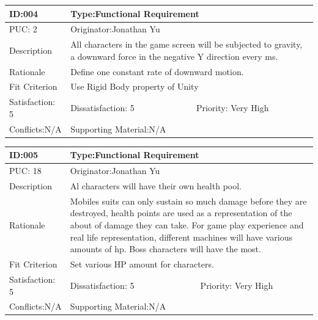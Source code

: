 \documentclass{article}
\begin{document}
\begin{table}[H]
\begin{tabular}{|l|l|l|}
\hline
ID:004 & \multicolumn{2}{l|}{Type:Functional Requirement} \\ \hline
PUC: 2& \multicolumn{2}{l|}{Originator:Jonathan Yu} \\ \hline
Description & \multicolumn{2}{m{0.85\textwidth}|}{All characters in the game screen will be subjected to gravity, a downward force in the negative Y direction every ms.} \\ \hline
Rationale & \multicolumn{2}{m{0.85\textwidth}|}{Define one constant rate of downward motion.} \\ \hline
Fit Criterion & \multicolumn{2}{m{0.85\textwidth}|}{Use Rigid Body property of Unity} \\ \hline
Satisfaction: 5 & Dissatisfaction: 5 & Priority: Very High \\ \hline
Conflicts:N/A & \multicolumn{2}{l|}{Supporting Material:N/A} \\ \hline
\end{tabular}
\end{table}

\begin{table}[H]
\begin{tabular}{|l|l|l|}
\hline
ID:005 & \multicolumn{2}{l|}{Type:Functional Requirement} \\ \hline
PUC: 18& \multicolumn{2}{l|}{Originator:Jonathan Yu} \\ \hline
Description & \multicolumn{2}{m{0.85\textwidth}|}{Al characters will have their own health pool.}\\\hline
Rationale & \multicolumn{2}{m{0.85\textwidth}|}{Mobiles suits can only sustain so much damage before they are destroyed, health points are used as a representation of the about of damage  they can take. For game play experience and real life representation, different machines will have various amounts of hp. Boss characters will have the most.} \\ \hline
Fit Criterion & \multicolumn{2}{m{0.85\textwidth}|}{Set various HP amount for characters.} \\ \hline
Satisfaction: 5 & Dissatisfaction: 5 & Priority: Very High \\ \hline
Conflicts:N/A & \multicolumn{2}{l|}{Supporting Material:N/A} \\ \hline
\end{tabular}
\end{table}
\end{document}
